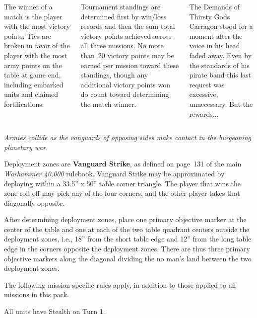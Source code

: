\begin{columns}
The winner of a match is the player with the most victory points.
Ties are broken in favor of the player with the most army points on
the table at game end, including embarked units and claimed
fortifications.

Tournament standings are determined first by win/loss records and then
the sum total victory points achieved across all three missions.  No
more than~20 victory points may be earned per mission toward these
standings, though any additional victory points won do count toward
determining the match winner.

\vfill
\begin{story}{24pt}{The Demands of Thirsty Gods}
  Carragon stood for a moment after the voice in his head faded away.
  Even by the standards of his pirate band this last request was
  excessive, unnecessary.  But the rewards...
\end{story}

\end{columns}


\centerline{\emph{Armies collide as the vanguards of opposing sides
    make contact in the burgeoning planetary war.}}


Deployment zones are \textbf{Vanguard Strike}, as defined on page~131
of the main \emph{Warhammer 40,000} rulebook.  Vanguard Strike may be
approximated by deploying within a 33.5'' x 50'' table corner
triangle.  The player that wins the zone roll off may pick any of the
four corners, and the other player takes that diagonally opposite.

\bigskip%
After determining deployment zones, place one primary objective marker
at the center of the table and one at each of the two table quadrant
centers outside the deployment zones, i.e., 18'' from the short table
edge and 12'' from the long table edge in the corners opposite the
deployment zones.  There are thus three primary objective markers
along the diagonal dividing the no man's land between the two
deployment zones.


The following mission specific rules apply, in addition to those
applied to all missions in this pack.

  All units have Stealth on Turn 1.


